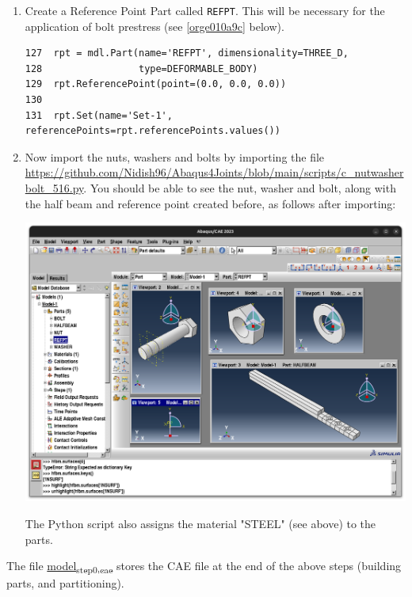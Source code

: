 \documentclass[11pt]{article}
\begin{document}
\begin{enumerate}
\item Create a Reference Point Part called \texttt{REFPT}.
This will be necessary for the application of bolt prestress (see \ref{orge010a9c} below).
\begin{verbatim}
127  rpt = mdl.Part(name='REFPT', dimensionality=THREE_D, 
128                 type=DEFORMABLE_BODY)
129  rpt.ReferencePoint(point=(0.0, 0.0, 0.0))
130  
131  rpt.Set(name='Set-1', referencePoints=rpt.referencePoints.values())
\end{verbatim}
\item Now import the nuts, washers and bolts by importing the file \url{https://github.com/Nidish96/Abaqus4Joints/blob/main/scripts/c\_nutwasherbolt\_516.py}.
You should be able to see the nut, washer and bolt, along with the half beam and reference point created before, as follows after importing:
\begin{center}
\includegraphics[width=.9\linewidth]{./figs/nwb.png}
\end{center}
The Python script also assigns the material "STEEL" (see above) to the parts.
\end{enumerate}

The file \href{https://github.com/Nidish96/Abaqus4Joints/blob/main/assets/assembly/model\_step0.cae}{model\textsubscript{step0.cae}} stores the CAE file at the end of the above steps (building parts, and partitioning).
\end{document}
